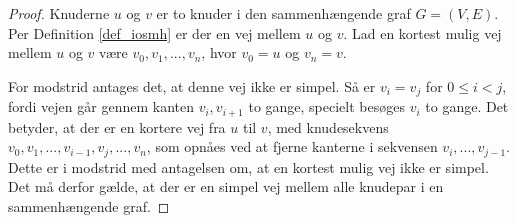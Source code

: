 \begin{proof}
Knuderne $u$ og $v$ er to knuder i den sammenhængende graf $G=(V,E)$.
Per Definition \ref{def_iosmh} er der en vej mellem $u$ og $v$.
Lad en kortest mulig vej mellem $u$ og $v$ være $v_0,v_1,...,v_n$, hvor $v_0=u$ og $v_n=v$.

For modstrid antages det, at denne vej ikke er simpel. 
Så er $v_i=v_j$ for $0 \leq i < j$, fordi vejen går gennem kanten $v_i,v_{i+1}$ to gange, specielt besøges $v_i$ to gange.
Det betyder, at der er en kortere vej fra $u$ til $v$, med knudesekvens $v_0,v_1,...,v_{i-1},v_j,...,v_n$, som opnåes ved at fjerne kanterne i sekvensen $v_i,...,v_{j-1}$.
Dette er i modstrid med antagelsen om, at en kortest mulig vej ikke er simpel.
Det må derfor gælde, at der er en simpel vej mellem alle knudepar i en sammenhængende graf. 
\end{proof}



